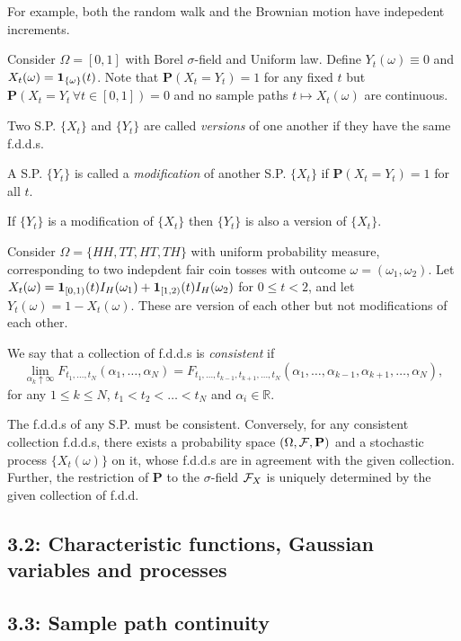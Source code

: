 \begin{remark*}
For example, both the random walk and the Brownian motion have indepedent increments.
\end{remark*}

\begin{example*}
Consider $\Omega = [0,1]$ with Borel $\sigma$-field and Uniform law. Define $Y_t(\omega) \equiv 0$ and $X_t(\omega) = \mathbf{1}_{\{\omega\}}(t)$. Note that $\mathbf P(X_t=Y_t)=1$ for any fixed $t$ but $\mathbf P(X_t=Y_t \, \forall t\in[0,1])=0$ and no sample paths $t \mapsto X_t(\omega)$ are continuous.
\end{example*}

\begin{definition*}
Two S.P. $\{X_t\}$ and $\{Y_t\}$ are called \emph{versions} of one another if they have the same f.d.d.s.
\end{definition*}

\begin{definition*}
A S.P. $\{Y_t\}$ is called a \emph{modification} of another S.P. $\{X_t\}$ if $\mathbf P(X_t = Y_t) = 1$ for all $t$.
\end{definition*}

\begin{exercise*}
If $\{Y_t\}$ is a modification of $\{X_t\}$ then $\{Y_t\}$ is also a version of $\{X_t\}$.
\end{exercise*}

\begin{example*}
Consider $\Omega = \{HH,TT,HT,TH\}$ with uniform probability measure, corresponding to two indepdent fair coin tosses with outcome $\omega=(\omega_1,\omega_2)$. Let $X_t(\omega) = \mathbf{1}_{[0,1)}(t)I_H(\omega_1) + \mathbf{1}_{[1,2)}(t)I_H(\omega_2)$ for $0\leq t<2$, and let $Y_t(\omega) = 1-X_t(\omega)$. These are version of each other but not modifications of each other.
\end{example*}

\begin{definition*}
We say that a collection of f.d.d.s is \emph{consistent} if 
\[
	\lim_{\alpha_k \uparrow \infty} F_{t_1,\dots,t_N}(\alpha_1,\dots,\alpha_N) = F_{t_1,\dots,t_{k-1},t_{k+1},\dots,t_N} (\alpha_1,\dots,\alpha_{k-1},\alpha_{k+1},\dots,\alpha_N),
\]
for any $1\leq k\leq N$, $t_1<t_2<\dots<t_N$ and $\alpha_i\in\mathbb R$.
\end{definition*}

\begin{proposition*}
The f.d.d.s of any S.P. must be consistent. Conversely, for any consistent collection f.d.d.s, there exists a probability space $(\Omega, \mathcal{F},\mathbf P)$ and a stochastic process $\{X_t(\omega)\}$ on it, whose f.d.d.s are in agreement with the given collection. Further, the restriction of $\mathbf P$ to the $\sigma$-field $\mathcal{F}_X$ is uniquely determined by the given collection of f.d.d.
\end{proposition*}

\subsection*{3.2: Characteristic functions, Gaussian variables and processes}
\subsection*{3.3: Sample path continuity}

